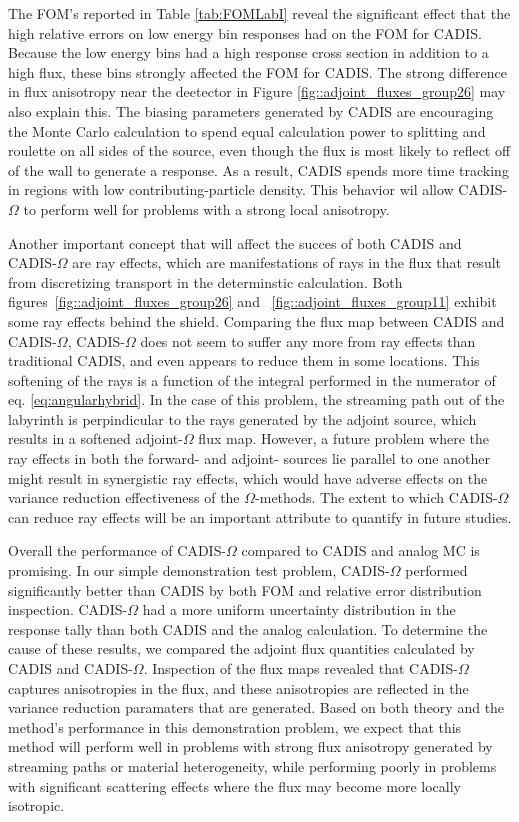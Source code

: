 \documentclass[12pt]{article}
\begin{document}
The FOM's reported in Table \ref{tab:FOMLabI} reveal the significant effect that the high relative errors on low energy bin responses had on the FOM for CADIS. Because the low energy bins had a high response cross section in addition to a high flux, these bins strongly affected the FOM for CADIS. The strong difference in flux anisotropy near the deetector in Figure \ref{fig::adjoint_fluxes_group26} may also explain this. The biasing parameters generated by CADIS are encouraging the Monte Carlo calculation to spend equal calculation power to splitting and roulette on all sides of the source, even though the flux is most likely to reflect off of the wall to generate a response. As a result, CADIS spends more time tracking in regions with low contributing-particle density. This behavior wil allow CADIS-$\Omega$ to perform well for problems with a strong local anisotropy.  

Another important concept that will affect the succes of both CADIS and CADIS-$\Omega$ are ray effects, which are manifestations of rays in the flux that result from discretizing transport in the determinstic calculation. Both figures~\ref{fig::adjoint_fluxes_group26} and ~\ref{fig::adjoint_fluxes_group11} exhibit some ray effects behind the shield. Comparing the flux map between CADIS and  CADIS-$\Omega$,  CADIS-$\Omega$ does not seem to suffer any more from ray effects than traditional CADIS, and even appears to reduce them in some locations. This softening of the rays is a function of the integral performed in the numerator of eq. \eqref{eq:angularhybrid}. In the case of this problem, the streaming path out of the labyrinth is perpindicular to the rays generated by the adjoint source, which results in a softened adjoint-$\Omega$ flux map. However, a future problem where the ray effects in both the forward- and adjoint- sources lie parallel to one another might result in synergistic ray effects, which would have adverse effects on the variance reduction effectiveness of the $\Omega$-methods. The extent to which CADIS-$\Omega$ can reduce ray effects will be an important attribute to quantify in future studies.


Overall the performance of CADIS-$\Omega$ compared to CADIS and analog MC is promising. In our simple demonstration test problem, CADIS-$\Omega$ performed significantly better than CADIS by both FOM and relative error distribution inspection. CADIS-$\Omega$ had a more uniform uncertainty distribution in the response tally than both CADIS and the analog calculation. To determine the cause of these results, we compared the adjoint flux quantities calculated by CADIS and CADIS-$\Omega$. Inspection of the flux maps revealed that CADIS-$\Omega$ captures anisotropies in the flux, and these anisotropies are reflected in the variance reduction paramaters that are generated. Based on both theory and the method's performance in this demonstration problem, we expect that this method will perform well in problems with strong flux anisotropy generated by streaming paths or material heterogeneity, while performing poorly in problems with significant scattering effects where the flux may become more locally isotropic. 
 
\end{document}
